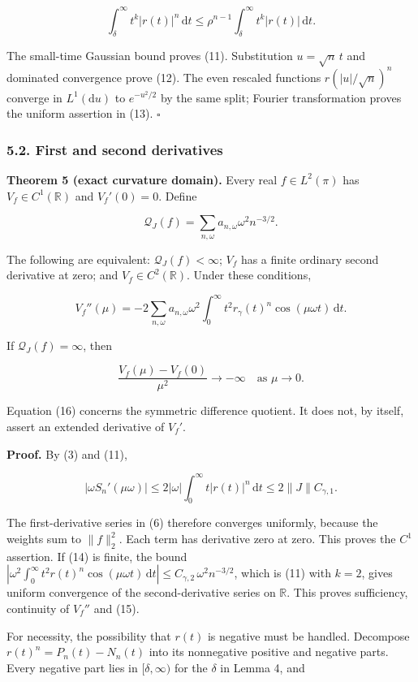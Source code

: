 \documentclass[
  british,
  11pt,
  a4paper,
]{article}
\begin{document}
\[
\int_\delta^\infty t^k|r(t)|^n\,\mathrm dt
\le\rho^{n-1}\int_\delta^\infty t^k|r(t)|\,\mathrm dt .
\]

The small-time Gaussian bound proves (11). Substitution \(u=\sqrt n\,t\)
and dominated convergence prove (12). The even rescaled functions
\(r(|u|/\sqrt n)^n\) converge in \(L^1(\mathrm du)\) to \(e^{-u^2/2}\)
by the same split; Fourier transformation proves the uniform assertion
in (13). \(\square\)

\subsubsection{5.2. First and second
derivatives}\label{first-and-second-derivatives}

\textbf{Theorem 5 (exact curvature domain).} Every real
\(f\in L^2(\pi)\) has \(V_f\in C^1(\mathbb R)\) and \(V_f'(0)=0\).
Define

\[
\mathcal Q_J(f)=\sum_{n,\omega}a_{n,\omega}\omega^2 n^{-3/2}. \tag{14}
\]

The following are equivalent: \(\mathcal Q_J(f)<\infty\); \(V_f\) has a
finite ordinary second derivative at zero; and
\(V_f\in C^2(\mathbb R)\). Under these conditions,

\[
V_f''(\mu)=-2\sum_{n,\omega}a_{n,\omega}\omega^2
\int_0^\infty t^2r_\gamma(t)^n\cos(\mu\omega t)\,\mathrm dt . \tag{15}
\]

If \(\mathcal Q_J(f)=\infty\), then

\[
\frac{V_f(\mu)-V_f(0)}{\mu^2}\longrightarrow-\infty
\quad\text{as }\mu\to0. \tag{16}
\]

Equation (16) concerns the symmetric difference quotient. It does not,
by itself, assert an extended derivative of \(V_f'\).

\textbf{Proof.} By (3) and (11),

\[
|\omega S_n'(\mu\omega)|
\le2|\omega|\int_0^\infty t|r(t)|^n\,\mathrm dt
\le2\|J\|C_{\gamma,1}.
\]

The first-derivative series in (6) therefore converges uniformly,
because the weights sum to \(\|f\|_2^2\). Each term has derivative zero
at zero. This proves the \(C^1\) assertion. If (14) is finite, the bound
\(|\omega^2\int_0^\infty t^2r(t)^n\cos(\mu\omega t)\,\mathrm dt|\le C_{\gamma,2}\,\omega^2n^{-3/2}\),
which is (11) with \(k=2\), gives uniform convergence of the
second-derivative series on \(\mathbb R\). This proves sufficiency,
continuity of \(V_f''\) and (15).

For necessity, the possibility that \(r(t)\) is negative must be
handled. Decompose \(r(t)^n=P_n(t)-N_n(t)\) into its nonnegative
positive and negative parts. Every negative part lies in
\([\delta,\infty)\) for the \(\delta\) in Lemma 4, and
\end{document}
